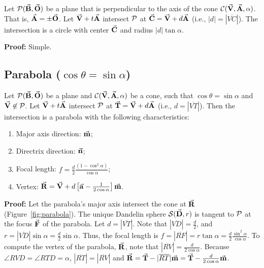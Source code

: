 \begin{lemma}
\label{lemma:parallel-1}
     Let ${\cal P}(\vec{\bf B},\vec{\bf O})$ be a plane that is perpendicular to
the axis of the cone ${\cal C}(\vec{\bf V},\vec{\bf A},\alpha)$.
That is, $\vec{\bf A} = \pm\vec{\bf O}$.  Let $\vec{\bf V}+t\vec{\bf A}$ intersect
${\cal P}$ at $\vec{\bf C}=\vec{\bf V}+d\vec{\bf A}$ (i.e., $|d| = |\overline{VC}|$).
The intersection is a circle with center $\vec{\bf C}$ and radius
$|d| \tan \alpha$.
\end{lemma}
{\bf Proof:} Simple. \QED



\subsection{Parabola ($\cos\theta=\sin\alpha$)}
\label{section:parabola}

\begin{theorem}
\label{theorem:parabola}
Let ${\cal P}(\vec{\bf B},\vec{\bf O})$ be a plane and
${\cal C}(\vec{\bf V},\vec{\bf A},\alpha)$ be a cone, such that
$\cos\theta=\sin\alpha$ and $\vec{\bf V}\not\in{\cal P}$.
Let $\vec{\bf V}+t\vec{\bf A}$ intersect
${\cal P}$ at $\vec{\bf T}=\vec{\bf V}+d\vec{\bf A}$ (i.e., $d = |\overline{VT}|$).
Then the intersection is a parabola with the following characteristics:
\begin{enumerate}
     \item Major axis direction: $\vec{\bf m}$;
     \item Directrix direction: $\vec{\bf n}$;
     \item Focal length: $f=\frac{d}{2}\frac{(1-\cos^2\alpha)}{\cos\alpha}$;
     \item Vertex: 
          $\vec{\bf R}=\vec{\bf V}+d\left[
          \vec{\bf a}-\frac{1}{2\cos\alpha}\right]\vec{\bf m}$.
\end{enumerate}
\end{theorem}     
{\bf Proof:}
Let the parabola's major axis intersect the cone at 
$\vec{\bf R}$ (Figure~\ref{fig:parabola}).  
The unique Dandelin sphere ${\cal S}(\vec{\bf D},r)$
is tangent to ${\cal P}$ at the focus $\vec{\bf F}$ of the parabola.
Let $d=|\overline{VT}|$.  Note that $|\overline{VD}|=\frac{d}{2}$,
and $r=|\overline{VD}|\sin\alpha=\frac{d}{2}\sin\alpha$.  
Thus, the focal length is 
$f=|\overline{RF}|=r\tan\alpha=\frac{d}{2}\frac{\sin^2\alpha}{\cos\alpha}$.
To compute the vertex of the parabola, $\vec{\bf R}$, 
note that $|\overline{RV}|=\frac{d}{2\cos\alpha}$.
Because $\angle RVD=\angle RTD=\alpha$, $|\overline{RT}|=|\overline{RV}|$ and 
$\vec{\bf R}=\vec{\bf T}-|\overline{RT}|\vec{\bf m}=
\vec{\bf T}-\frac{d}{2\cos\alpha}\vec{\bf m}$.
\QED

